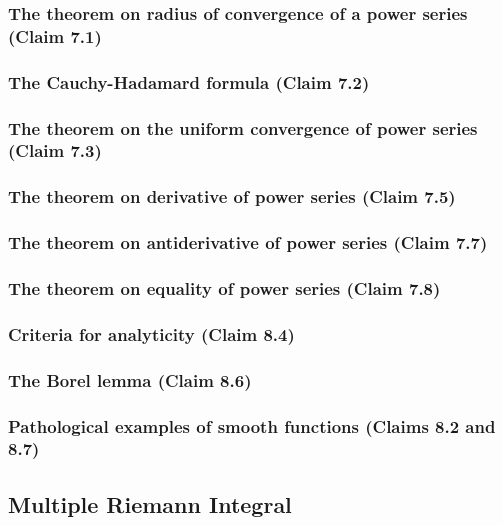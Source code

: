 \subsubsection{The theorem on radius of convergence of a power series (Claim 7.1)}

\subsubsection{The Cauchy-Hadamard formula (Claim 7.2)}

\subsubsection{The theorem on the uniform convergence of power series (Claim 7.3)}

\subsubsection{The theorem on derivative of power series (Claim 7.5)}

\subsubsection{The theorem on antiderivative of power series (Claim 7.7)}

\subsubsection{The theorem on equality of power series (Claim 7.8)}

\subsubsection{Criteria for analyticity (Claim 8.4)}

\subsubsection{The Borel lemma (Claim 8.6)}

\subsubsection{Pathological examples of smooth functions (Claims 8.2 and 8.7)}

\clearpage

\subsection{Multiple Riemann Integral}

